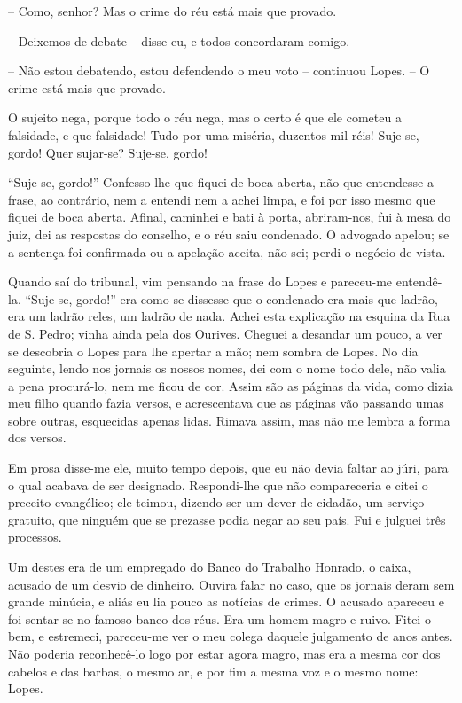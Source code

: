 -- Como, senhor? Mas o crime do réu está mais que provado.

-- Deixemos de debate -- disse eu, e todos concordaram comigo.

-- Não estou debatendo, estou defendendo o meu voto -- continuou Lopes.
-- O crime está mais que provado.

O sujeito nega, porque todo o réu nega, mas o certo é que ele cometeu a
falsidade, e que falsidade! Tudo por uma miséria, duzentos mil-réis!
Suje-se, gordo! Quer sujar-se? Suje-se, gordo!

``Suje-se, gordo!'' Confesso-lhe que fiquei de boca aberta, não que
entendesse a frase, ao contrário, nem a entendi nem a achei limpa, e foi
por isso mesmo que fiquei de boca aberta. Afinal, caminhei e bati à
porta, abriram-nos, fui à mesa do juiz, dei as respostas do conselho, e
o réu saiu condenado. O advogado apelou; se a sentença foi confirmada ou
a apelação aceita, não sei; perdi o negócio de vista.

Quando saí do tribunal, vim pensando na frase do Lopes e pareceu-me
entendê-la. ``Suje-se, gordo!'' era como se dissesse que o condenado era
mais que ladrão, era um ladrão reles, um ladrão de nada. Achei esta
explicação na esquina da Rua de S. Pedro; vinha ainda pela dos Ourives.
Cheguei a desandar um pouco, a ver se descobria o Lopes para lhe apertar
a mão; nem sombra de Lopes. No dia seguinte, lendo nos jornais os nossos
nomes, dei com o nome todo dele, não valia a pena procurá-lo, nem me
ficou de cor. Assim são as páginas da vida, como dizia meu filho quando
fazia versos, e acrescentava que as páginas vão passando umas sobre
outras, esquecidas apenas lidas. Rimava assim, mas não me lembra a forma
dos versos.

Em prosa disse-me ele, muito tempo depois, que eu não devia faltar ao
júri, para o qual acabava de ser designado. Respondi-lhe que não
compareceria e citei o preceito evangélico; ele teimou, dizendo ser um
dever de cidadão, um serviço gratuito, que ninguém que se prezasse podia
negar ao seu país. Fui e julguei três processos.

Um destes era de um empregado do Banco do Trabalho Honrado, o caixa,
acusado de um desvio de dinheiro. Ouvira falar no caso, que os jornais
deram sem grande minúcia, e aliás eu lia pouco as notícias de crimes. O
acusado apareceu e foi sentar-se no famoso banco dos réus. Era um homem
magro e ruivo. Fitei-o bem, e estremeci, pareceu-me ver o meu colega
daquele julgamento de anos antes. Não poderia reconhecê-lo logo por
estar agora magro, mas era a mesma cor dos cabelos e das barbas, o mesmo
ar, e por fim a mesma voz e o mesmo nome: Lopes.

